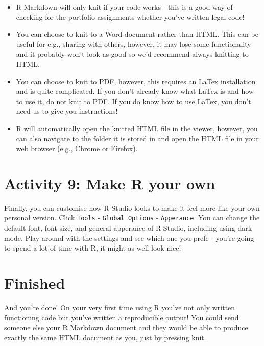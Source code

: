 \documentclass[]{book}
\providecommand{\tightlist}{%
  \setlength{\itemsep}{0pt}\setlength{\parskip}{0pt}}
\begin{document}
\begin{itemize}
\tightlist
\item
  R Markdown will only knit if your code works - this is a good way of checking for the portfolio assignments whether you've written legal code!\\
\item
  You can choose to knit to a Word document rather than HTML. This can be useful for e.g., sharing with others, however, it may lose some functionality and it probably won't look as good so we'd recommend always knitting to HTML.\\
\item
  You can choose to knit to PDF, however, this requires an LaTex installation and is quite complicated. If you don't already know what LaTex is and how to use it, do not knit to PDF. If you do know how to use LaTex, you don't need us to give you instructions!
\item
  R will automatically open the knitted HTML file in the viewer, however, you can also navigate to the folder it is stored in and open the HTML file in your web browser (e.g., Chrome or Firefox).
\end{itemize}

\hypertarget{activity-9-make-r-your-own}{%
\section{Activity 9: Make R your own}\label{activity-9-make-r-your-own}}

Finally, you can customise how R Studio looks to make it feel more like your own personal version. Click \texttt{Tools} - \texttt{Global\ Options} - \texttt{Apperance}. You can change the default font, font size, and general apperance of R Studio, including using dark mode. Play around with the settings and see which one you prefe - you're going to spend a lot of time with R, it might as well look nice!

\hypertarget{finished}{%
\section{Finished}\label{finished}}

And you're done! On your very first time using R you've not only written functioning code but you've written a reproducible output! You could send someone else your R Markdown document and they would be able to produce exactly the same HTML document as you, just by pressing knit.
\end{document}

